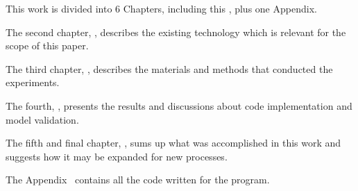 	This work is divided into 6 Chapters, including this \textbf{}, plus one Appendix.
	
	The second chapter, \textbf{}, describes the existing technology which is relevant for the scope of this paper.

	The third chapter, \textbf{}, describes the materials and methods that conducted the experiments.
	
	The fourth, \textbf{}, presents the results and discussions about code implementation and model validation.
	
	The fifth and final chapter, \textbf{}, sums up what was accomplished in this work and suggests how it may be expanded for new processes.
	
	The Appendix~\textbf{} contains all the code written for the program.